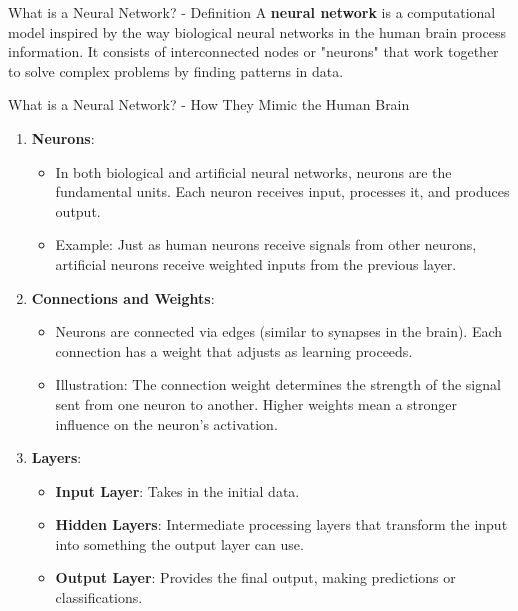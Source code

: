 \documentclass[aspectratio=169]{beamer}
\begin{document}
\begin{frame}[fragile]{What is a Neural Network? - Definition}
    A \textbf{neural network} is a computational model inspired by the way biological neural networks in the human brain process information. It consists of interconnected nodes or "neurons" that work together to solve complex problems by finding patterns in data.
\end{frame}

\begin{frame}[fragile]{What is a Neural Network? - How They Mimic the Human Brain}
    \begin{enumerate}
        \item \textbf{Neurons}:
        \begin{itemize}
            \item In both biological and artificial neural networks, neurons are the fundamental units. Each neuron receives input, processes it, and produces output.
            \item Example: Just as human neurons receive signals from other neurons, artificial neurons receive weighted inputs from the previous layer.
        \end{itemize}
        
        \item \textbf{Connections and Weights}:
        \begin{itemize}
            \item Neurons are connected via edges (similar to synapses in the brain). Each connection has a weight that adjusts as learning proceeds.
            \item Illustration: The connection weight determines the strength of the signal sent from one neuron to another. Higher weights mean a stronger influence on the neuron’s activation.
        \end{itemize}
        
        \item \textbf{Layers}:
        \begin{itemize}
            \item \textbf{Input Layer}: Takes in the initial data.
            \item \textbf{Hidden Layers}: Intermediate processing layers that transform the input into something the output layer can use.
            \item \textbf{Output Layer}: Provides the final output, making predictions or classifications.
        \end{itemize}
    \end{enumerate}
\end{frame}
\end{document}
